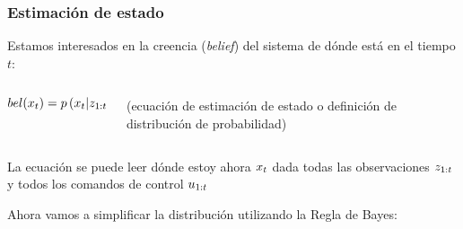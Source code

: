\begin{frame}
	\frametitle{Estimación de estado}
	
	Estamos interesados en la creencia (\emph{belief}) del sistema de dónde está en el tiempo $t$:
    
    \begin{columns}[t]
        \begin{column}{0.5\textwidth}
        	\begin{equation}
            bel(x_{t}) = p\left(x_{t} | z_{1:t}, u_{1:t} \right)
            \end{equation}
        \end{column}
        \begin{column}{0.5\textwidth}
        (ecuación de estimación de estado o definición de distribución de probabilidad)
        \end{column}
    \end{columns}
    \vspace{1cm}
    La ecuación se puede leer dónde estoy ahora $x_{t}$ dada todas las observaciones $z_{1:t}$ y todos los comandos de control $u_{1:t}$

    Ahora vamos a simplificar la distribución utilizando la Regla de Bayes:

\end{frame}


